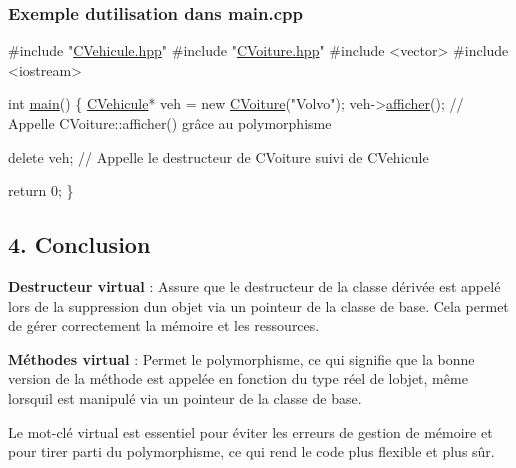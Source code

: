 \subsubsection*{Exemple d\textquotesingle{}utilisation dans {\ttfamily main.\+cpp}}


\begin{DoxyCode}
\textcolor{preprocessor}{#include "\hyperlink{CVehicule_8hpp}{CVehicule.hpp}"}
\textcolor{preprocessor}{#include "\hyperlink{CVoiture_8hpp}{CVoiture.hpp}"}
\textcolor{preprocessor}{#include <vector>}
\textcolor{preprocessor}{#include <iostream>}

\textcolor{keywordtype}{int} \hyperlink{htop_8c_a3c04138a5bfe5d72780bb7e82a18e627}{main}() \{
    \hyperlink{classCVehicule}{CVehicule}* veh = \textcolor{keyword}{new} \hyperlink{classCVoiture}{CVoiture}(\textcolor{stringliteral}{"Volvo"});
    veh->\hyperlink{classCVehicule_a7d62fa555949feb096b4f56781164895}{afficher}(); \textcolor{comment}{// Appelle CVoiture::afficher() grâce au polymorphisme}

    \textcolor{keyword}{delete} veh; \textcolor{comment}{// Appelle le destructeur de CVoiture suivi de CVehicule}

    \textcolor{keywordflow}{return} 0;
\}
\end{DoxyCode}


\subsection*{4. Conclusion}


\begin{DoxyItemize}
\item {\bfseries Destructeur {\ttfamily virtual}} \+: Assure que le destructeur de la classe dérivée est appelé lors de la suppression d\textquotesingle{}un objet via un pointeur de la classe de base. Cela permet de gérer correctement la mémoire et les ressources.
\item {\bfseries Méthodes {\ttfamily virtual}} \+: Permet le polymorphisme, ce qui signifie que la bonne version de la méthode est appelée en fonction du type réel de l\textquotesingle{}objet, même lorsqu\textquotesingle{}il est manipulé via un pointeur de la classe de base.
\end{DoxyItemize}

Le mot-\/clé {\ttfamily virtual} est essentiel pour éviter les erreurs de gestion de mémoire et pour tirer parti du polymorphisme, ce qui rend le code plus flexible et plus sûr. 